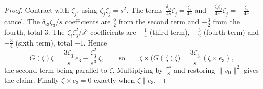 \begin{proof}
Contract with $\zeta_j$, using $\zeta_j\zeta_j=s^2$. The terms
$\frac{\delta_{ij}}{4s}\zeta_j=\frac{\zeta_i}{4s}$ and
$-\frac{\zeta_i\zeta_j}{4s^3}\zeta_j=-\frac{\zeta_i}{4s}$ cancel. The
$\delta_{i3}\zeta_3/s$ coefficients are $\frac92$ from the second term
and $-\frac32$ from the fourth, total $3$. The $\zeta_i\zeta_3^2/s^3$
coefficients are $-\frac14$ (third term), $-\frac32$ (fourth term) and
$+\frac34$ (sixth term), total $-1$. Hence
\[
G(\zeta)\zeta=\frac{3\zeta_3}{s}\,e_3-\frac{\zeta_3^{2}}{s^{3}}\,\zeta ,
\qquad\text{so}\qquad
\zeta\times\big(G(\zeta)\zeta\big)=\frac{3\zeta_3}{s}\,(\zeta\times e_3),
\]
the second term being parallel to $\zeta$. Multiplying by
$\frac{\pi^3}{8}$ and restoring $\|v_0\|^2$ gives the claim. Finally
$\zeta\times e_3=0$ exactly when $\zeta\parallel e_3$.
\end{proof}

